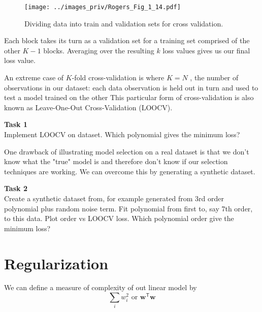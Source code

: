 \begin{figure}[h]
\begin{center}
\texttt{[image: ../images\_priv/Rogers\_Fig\_1\_14.pdf]}
\end{center}
\caption{Dividing data into train and validation sets for cross validation.}
\end{figure}

Each block takes its turn as a
validation set for a training set comprised of the other $K-1$ blocks. Averaging over
the resulting $k$ loss values gives us our final loss value.

An extreme case of $K$-fold
cross-validation is where $K = N$ , the number of observations in our dataset: each
data observation is held out in turn and used to test a model trained on the other
This particular form of cross-validation is also known as Leave-One-Out
Cross-Validation (LOOCV).

\begin{mdframed}[topline=false,bottomline=false,leftline=true,rightline=false]
\textbf{Task 1} \\
Implement LOOCV on  dataset. Which polynomial gives the
minimum loss?
\end{mdframed}

One drawback of illustrating model selection on a real dataset is that we don't
know what the "true" model is and therefore don't know if our selection techniques
are working. We can overcome this by generating a synthetic dataset.

\begin{mdframed}[topline=false,bottomline=false,leftline=true,rightline=false]
\textbf{Task 2}\\
Create a synthetic dataset from, for example generated from 3rd order
polynomial plus random noise term. Fit polynomial from first to, say 7th order,
to this data. Plot order vs LOOCV loss. Which polynomial order give the minimum loss?
\end{mdframed}

\section{Regularization}

We can define a measure of complexity of out linear model by
\begin{equation}
\sum_{i} w_{i}^{2}\,\,\text{or }\mathbf{w}^{\mathsf{T}}\mathbf{w}
\end{equation}

